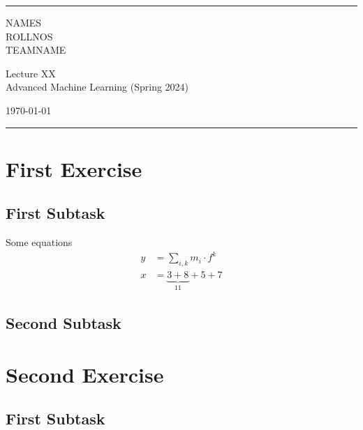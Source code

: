 \documentclass[a4paper]{article}
\begin{document}

\fancyhead[C]{}
\hrule \medskip %
\begin{minipage}{0.295\textwidth} 
\raggedright
\footnotesize
NAMES \hfill\\   
ROLLNOS\hfill\\
TEAMNAME
\end{minipage}
\begin{minipage}{0.4\textwidth} 
\centering 
\large 
Lecture XX\\ 
\normalsize 
Advanced Machine Learning (Spring 2024)\\ 
\end{minipage}
\begin{minipage}{0.295\textwidth} 
\raggedleft
\today\hfill\\
\end{minipage}
\medskip\hrule 
\bigskip


\section{First Exercise}
\blindtext
\subsection{First Subtask}
Some equations
\begin{align*}
y &=  \sum\limits_{i,k} m_i \cdot f^k \\
x &=  
\underset{11}{\underbrace{3 + 8}} + 5 + 7
\end{align*}

\subsection{Second Subtask}
\blindtext

\bigskip


\section{Second Exercise}
\blindtext
\subsection{First Subtask}

\bigskip

\end{document}
